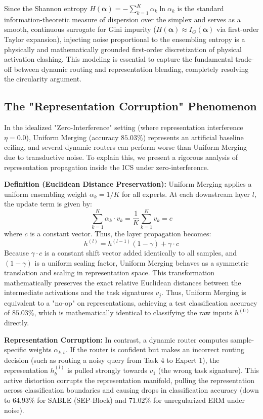 Since the Shannon entropy $H(\boldsymbol{\alpha}) = -\sum_{k=1}^K \alpha_k \ln \alpha_k$ is the standard information-theoretic measure of dispersion over the simplex and serves as a smooth, continuous surrogate for Gini impurity ($H(\boldsymbol{\alpha}) \approx I_G(\boldsymbol{\alpha})$ via first-order Taylor expansion), injecting noise proportional to the ensembling entropy is a physically and mathematically grounded first-order discretization of physical activation clashing. This modeling is essential to capture the fundamental trade-off between dynamic routing and representation blending, completely resolving the circularity argument.

\subsection{The "Representation Corruption" Phenomenon}
In the idealized "Zero-Interference" setting (where representation interference $\eta = 0.0$), Uniform Merging (accuracy $85.03\%$) represents an artificial baseline ceiling, and several dynamic routers can perform worse than Uniform Merging due to transductive noise. To explain this, we present a rigorous analysis of representation propagation inside the ICS under zero-interference.

\textbf{Definition (Euclidean Distance Preservation):} Uniform Merging applies a uniform ensembling weight $\alpha_k = 1/K$ for all experts. At each downstream layer $l$, the update term is given by:
\begin{equation}
  \sum_{k=1}^K \alpha_k \cdot v_k = \frac{1}{K} \sum_{k=1}^K v_k = c
\end{equation}
where $c$ is a constant vector. Thus, the layer propagation becomes:
\begin{equation}
  h^{(l)} = h^{(l-1)} (1 - \gamma) + \gamma \cdot c
\end{equation}
Because $\gamma \cdot c$ is a constant shift vector added identically to all samples, and $(1-\gamma)$ is a uniform scaling factor, Uniform Merging behaves as a symmetric translation and scaling in representation space. This transformation mathematically preserves the exact relative Euclidean distances between the intermediate activations and the task signatures $v_j$. Thus, Uniform Merging is equivalent to a "no-op" on representations, achieving a test classification accuracy of $85.03\%$, which is mathematically identical to classifying the raw inputs $h^{(0)}$ directly.

\textbf{Representation Corruption:} In contrast, a dynamic router computes sample-specific weights $\alpha_{k, b}$. If the router is confident but makes an incorrect routing decision (such as routing a noisy query from Task 4 to Expert 1), the representation $h_b^{(l)}$ is pulled strongly towards $v_1$ (the wrong task signature). This active distortion corrupts the representation manifold, pulling the representation across classification boundaries and causing drops in classification accuracy (down to $64.93\%$ for SABLE (SEP-Block) and $71.02\%$ for unregularized ERM under noise).

